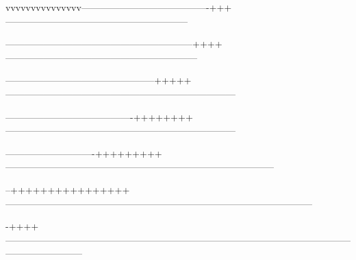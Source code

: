 \documentclass{article}
\begin{document}
vvvvvvvvvvvvvvv----------------------------------------+++———————————————————

-----------------------------------------------------------++++————————————————————

-----------------------------------------------+++++————————————————————————

----------------------------------------++++++++————————————————————————

----------------------------+++++++++————————————————————————————

--++++++++++++++++————————————————————————————————

-++++————————————————————————————————————————————
\end{document}
